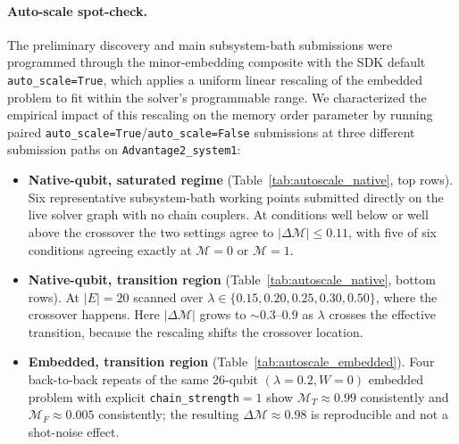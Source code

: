 \documentclass[aps,prapplied,reprint,superscriptaddress,floatfix,nofootinbib]{revtex4-2}
\begin{document}
\paragraph{Auto-scale spot-check.}
The preliminary discovery and main subsystem-bath submissions were programmed through the minor-embedding composite with the SDK default \texttt{auto\_scale=True}, which applies a uniform linear rescaling of the embedded problem to fit within the solver's programmable range.
We characterized the empirical impact of this rescaling on the memory order parameter by running paired \texttt{auto\_scale=True}/\texttt{auto\_scale=False} submissions at three different submission paths on \texttt{Advantage2\_system1}:
\begin{itemize}
\item \textbf{Native-qubit, saturated regime} (Table~\ref{tab:autoscale_native}, top rows).  Six representative subsystem-bath working points submitted directly on the live solver graph with no chain couplers.  At conditions well below or well above the crossover the two settings agree to $|\Delta\mathcal{M}|\le 0.11$, with five of six conditions agreeing exactly at $\mathcal{M}=0$ or $\mathcal{M}=1$.
\item \textbf{Native-qubit, transition region} (Table~\ref{tab:autoscale_native}, bottom rows).  At $|E|=20$ scanned over $\lambda\in\{0.15,0.20,0.25,0.30,0.50\}$, where the crossover happens.  Here $|\Delta\mathcal{M}|$ grows to $\sim 0.3$--$0.9$ as $\lambda$ crosses the effective transition, because the rescaling shifts the crossover location.
\item \textbf{Embedded, transition region} (Table~\ref{tab:autoscale_embedded}).  Four back-to-back repeats of the same 26-qubit $(\lambda=0.2,W=0)$ embedded problem with explicit \texttt{chain\_strength$=1$} show $\mathcal{M}_T\approx 0.99$ consistently and $\mathcal{M}_F\approx 0.005$ consistently; the resulting $\Delta\mathcal{M}\approx 0.98$ is reproducible and not a shot-noise effect.
\end{itemize}
\end{document}
